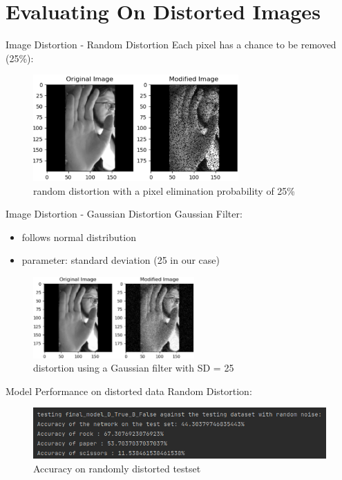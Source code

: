 \documentclass[aspectratio=169]{beamer}
\begin{document}
{\section{Evaluating On Distorted Images}
	\begin{frame}{Image Distortion - Random Distortion}
		Each pixel has a chance to be removed (25\%):
		\begin{figure}
			\centering
			\includegraphics[width=0.7\textwidth]{img/randomDistortion1.png}
			\caption{random distortion with a pixel elimination probability of 25\%}
		\end{figure}
	\end{frame}

	\begin{frame}{Image Distortion - Gaussian Distortion}
	Gaussian Filter:
		\begin{itemize}
			\item follows normal distribution
			\item parameter: standard deviation (25 in our case)
		\end{itemize}
	\pause
		\begin{figure}
			\centering
			\includegraphics[width=0.55\textwidth]{img/gaussianDistortion1.png}
			\caption{distortion using a Gaussian filter with SD = 25}
		\end{figure}
	\end{frame}
	
	
	\begin{frame}{Model Performance on distorted data}
		Random Distortion:
		\begin{figure}
			\centering
			\includegraphics[width=1\textwidth]{img/TestAccuracy_final_test_rm.png}
			\caption{Accuracy on randomly distorted testset}
		\end{figure}   
	\end{frame}

}
\end{document}
